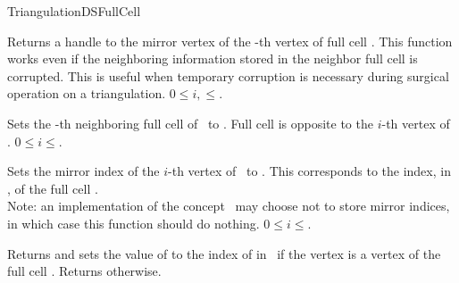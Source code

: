\begin{ccRefConcept}{TriangulationDSFullCell}

\begin{ccAdvanced}
{Returns a handle to the mirror vertex of the -th vertex of full cell
\ccVar. This function works even if the neighboring information stored in the
neighbor full cell \ccc{*}\ccVar{} is corrupted. This is useful
when temporary corruption is necessary during surgical operation on a
triangulation.  \ccPrecond $0\leq
i,$$\leq$.}
\end{ccAdvanced}




 {Sets the
-th neighboring full cell of \ccVar\ to . Full cell  is
opposite to the $i$-th vertex of \ccVar. 
\ccPrecond $0\leq i\leq$.}

 {Sets the
mirror index of the $i$-th vertex of \ccVar\ to . This corresponds
to the index, in \ccVar{}, of the full cell \ccVar.\\
Note: an implementation of the concept \ccVar\ may choose not to store mirror
indices, in which case this function should do nothing.
\ccPrecond $0\leq i\leq$.}




%
{Returns  and sets the value of  to the index of  in
\ccVar\ if the vertex  is a vertex of the full cell \ccVar. Returns
 otherwise.}


\end{ccRefConcept}
